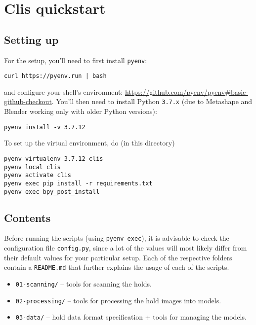 \chapter{Clis quickstart}

\section{Setting up}

For the setup, you'll need to first install \texttt{pyenv}:

\begin{verbatim}
curl https://pyenv.run | bash
\end{verbatim}

and configure your shell's environment: \url{https://github.com/pyenv/pyenv\#basic-github-checkout}.
You'll then need to install Python \texttt{3.7.x} (due to Metashape and Blender working only with older Python versions):

\begin{verbatim}
pyenv install -v 3.7.12
\end{verbatim}

To set up the virtual environment, do (in this directory)

\begin{verbatim}
pyenv virtualenv 3.7.12 clis
pyenv local clis
pyenv activate clis
pyenv exec pip install -r requirements.txt
pyenv exec bpy_post_install
\end{verbatim}

\section{Contents}

Before running the scripts (using \texttt{pyenv\ exec}), it is advisable
to check the configuration file \texttt{config.py}, since a lot of the values will most likely
differ from their default values for your particular setup. Each of the
respective folders contain a \texttt{README.md} that further explains
the usage of each of the scripts.

\begin{itemize}
	\item \texttt{01-scanning/} -- tools for scanning the holds.
	\item \texttt{02-processing/} -- tools for processing the hold images into models.
	\item \texttt{03-data/} -- hold data format specification + tools for managing the models.
\end{itemize}

